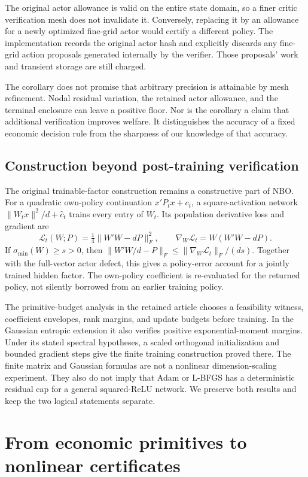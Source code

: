 \documentclass[ecta,nameyear,draft]{econsocart}
\begin{document}
The original actor allowance is valid on the entire state domain, so a finer critic verification mesh does not invalidate it. Conversely, replacing it by an allowance for a newly optimized fine-grid actor would certify a different policy. The implementation records the original actor hash and explicitly discards any fine-grid action proposals generated internally by the verifier. Those proposals' work and transient storage are still charged.

The corollary does not promise that arbitrary precision is attainable by mesh refinement. Nodal residual variation, the retained actor allowance, and the terminal enclosure can leave a positive floor. Nor is the corollary a claim that additional verification improves welfare. It distinguishes the accuracy of a fixed economic decision rule from the sharpness of our knowledge of that accuracy.

\subsection{Construction beyond post-training verification}
The original trainable-factor construction remains a constructive part of NBO. For a quadratic own-policy continuation $x'P_tx+c_t$, a square-activation network $\|W_tx\|^2/d+\widehat c_t$ trains every entry of $W_t$. Its population derivative loss and gradient are
\[
 \mathcal L_t(W;P)=\tfrac14\|W'W-dP\|_F^2,
 \qquad \nabla_W\mathcal L_t=W(W'W-dP).
\]
If $\sigma_{\min}(W)\geq s>0$, then
$\|W'W/d-P\|_F\leq\|\nabla_W\mathcal L_t\|_F/(ds)$.
Together with the full-vector actor defect, this gives a policy-error account for a jointly trained hidden factor. The own-policy coefficient is re-evaluated for the returned policy, not silently borrowed from an earlier training policy.

The primitive-budget analysis in the retained article chooses a feasibility witness, coefficient envelopes, rank margins, and update budgets before training. In the Gaussian entropic extension it also verifies positive exponential-moment margins. Under its stated spectral hypotheses, a scaled orthogonal initialization and bounded gradient steps give the finite training construction proved there. The finite matrix and Gaussian formulas are not a nonlinear dimension-scaling experiment. They also do not imply that Adam or L-BFGS has a deterministic residual cap for a general squared-ReLU network. We preserve both results and keep the two logical statements separate.

\section{From economic primitives to nonlinear certificates}\label{sec:algorithm}
\end{document}
